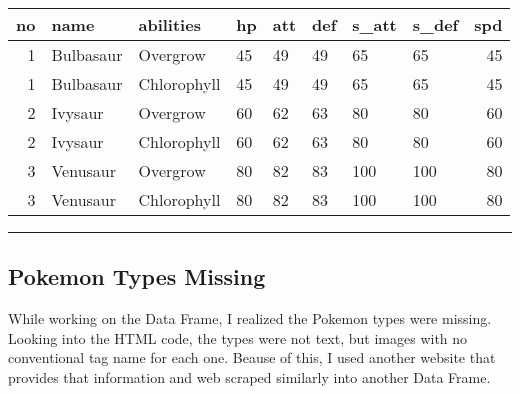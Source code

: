 \documentclass[
]{article}
\begin{document}
\begin{longtable}[]{@{}rlllllllr@{}}
\toprule()
no & name & abilities & hp & att & def & s\_att & s\_def & spd \\
\midrule()
\endhead
1 & Bulbasaur & Overgrow & 45 & 49 & 49 & 65 & 65 & 45 \\
1 & Bulbasaur & Chlorophyll & 45 & 49 & 49 & 65 & 65 & 45 \\
2 & Ivysaur & Overgrow & 60 & 62 & 63 & 80 & 80 & 60 \\
2 & Ivysaur & Chlorophyll & 60 & 62 & 63 & 80 & 80 & 60 \\
3 & Venusaur & Overgrow & 80 & 82 & 83 & 100 & 100 & 80 \\
3 & Venusaur & Chlorophyll & 80 & 82 & 83 & 100 & 100 & 80 \\
\bottomrule()
\end{longtable}

\begin{center}\rule{0.5\linewidth}{0.5pt}\end{center}

\hypertarget{pokemon-types-missing}{%
\subsection{Pokemon Types Missing}\label{pokemon-types-missing}}

While working on the Data Frame, I realized the Pokemon types were
missing. Looking into the HTML code, the types were not text, but images
with no conventional tag name for each one. Beause of this, I used
another website that provides that information and web scraped similarly
into another Data Frame.
\end{document}

